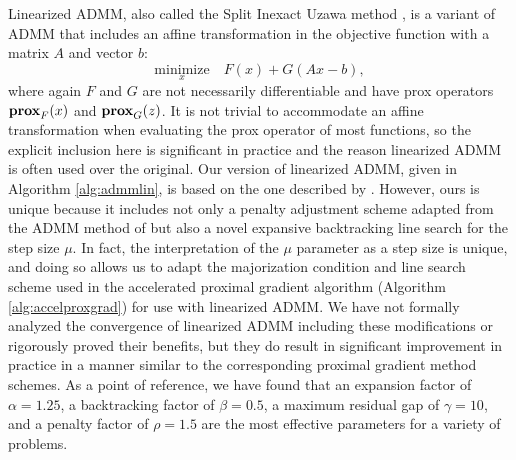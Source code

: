 Linearized ADMM, also called the Split Inexact Uzawa method \autocite{EZC10}, is a variant of ADMM that includes an affine transformation in the objective function with a matrix $A$ and vector $b$:
\begin{equation}
 \underset{x}{\mathrm{minimize}} \quad F(x) + G(Ax - b),
\end{equation}
where again $F$ and $G$ are not necessarily differentiable and have prox operators $\operatorname{\mathbf{prox}}_{F}(x)$ and $\operatorname{\mathbf{prox}}_{G}(z)$. It is not trivial to accommodate an affine transformation when evaluating the prox operator of most functions, so the explicit inclusion here is significant in practice and the reason linearized ADMM is often used over the original. Our version of linearized ADMM, given in Algorithm \ref{alg:admmlin}, is based on the one described by \textcite{PB13}. However, ours is unique because it includes not only a penalty adjustment scheme adapted from the ADMM method of \textcite{BPC+11} but also a novel expansive backtracking line search for the step size $\mu$. In fact, the interpretation of the $\mu$ parameter as a step size is unique, and doing so allows us to adapt the majorization condition and line search scheme used in the accelerated proximal gradient algorithm (Algorithm \ref{alg:accelproxgrad}) for use with linearized ADMM. We have not formally analyzed the convergence of linearized ADMM including these modifications or rigorously proved their benefits, but they do result in significant improvement in practice in a manner similar to the corresponding proximal gradient method schemes. As a point of reference, we have found that an expansion factor of $\alpha=1.25$, a backtracking factor of $\beta=0.5$, a maximum residual gap of $\gamma=10$, and a penalty factor of $\rho=1.5$ are the most effective parameters for a variety of problems.

